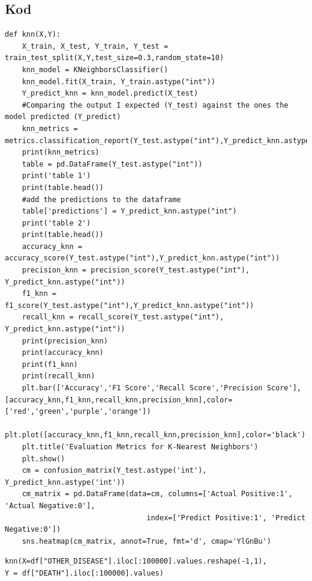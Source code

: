 \documentclass{article}
\begin{document}
{\subsection{Kod}
\begin{lstlisting}
def knn(X,Y):
    X_train, X_test, Y_train, Y_test = train_test_split(X,Y,test_size=0.3,random_state=10)
    knn_model = KNeighborsClassifier()
    knn_model.fit(X_train, Y_train.astype("int"))
    Y_predict_knn = knn_model.predict(X_test)
    #Comparing the output I expected (Y_test) against the ones the model predicted (Y_predict)
    knn_metrics = metrics.classification_report(Y_test.astype("int"),Y_predict_knn.astype("int"))
    print(knn_metrics)
    table = pd.DataFrame(Y_test.astype("int"))
    print('table 1')
    print(table.head())
    #add the predictions to the dataframe
    table['predictions'] = Y_predict_knn.astype("int")
    print('table 2')
    print(table.head())
    accuracy_knn = accuracy_score(Y_test.astype("int"),Y_predict_knn.astype("int"))
    precision_knn = precision_score(Y_test.astype("int"), Y_predict_knn.astype("int"))
    f1_knn = f1_score(Y_test.astype("int"),Y_predict_knn.astype("int"))
    recall_knn = recall_score(Y_test.astype("int"), Y_predict_knn.astype("int"))
    print(precision_knn)
    print(accuracy_knn)
    print(f1_knn)
    print(recall_knn)
    plt.bar(['Accuracy','F1 Score','Recall Score','Precision Score'],[accuracy_knn,f1_knn,recall_knn,precision_knn],color=['red','green','purple','orange'])
    plt.plot([accuracy_knn,f1_knn,recall_knn,precision_knn],color='black')
    plt.title('Evaluation Metrics for K-Nearest Neighbors')
    plt.show()
    cm = confusion_matrix(Y_test.astype('int'), Y_predict_knn.astype('int'))
    cm_matrix = pd.DataFrame(data=cm, columns=['Actual Positive:1', 'Actual Negative:0'], 
                                 index=['Predict Positive:1', 'Predict Negative:0'])
    sns.heatmap(cm_matrix, annot=True, fmt='d', cmap='YlGnBu')

\end{lstlisting}

    \begin{lstlisting}
knn(X=df["OTHER_DISEASE"].iloc[:100000].values.reshape(-1,1),
Y = df["DEATH"].iloc[:100000].values)


\end{lstlisting}}
\end{document}
